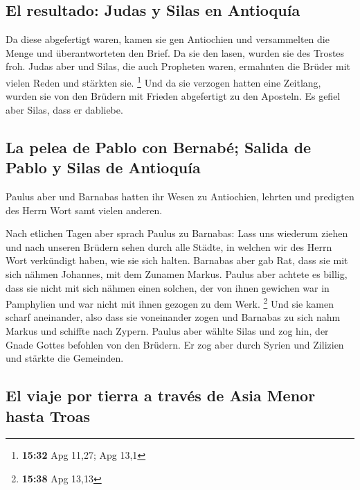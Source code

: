 \hypertarget{el-resultado-judas-y-silas-en-antioquuxeda}{%
\subsection{El resultado: Judas y Silas en
Antioquía}\label{el-resultado-judas-y-silas-en-antioquuxeda}}

 Da diese abgefertigt waren, kamen sie gen Antiochien und
versammelten die Menge und überantworteten den Brief.  Da
sie den lasen, wurden sie des Trostes froh.  Judas aber
und Silas, die auch Propheten waren, ermahnten die Brüder mit vielen
Reden und stärkten sie. \footnote{\textbf{15:32} Apg 11,27; Apg 13,1}
 Und da sie verzogen hatten eine Zeitlang, wurden sie von
den Brüdern mit Frieden abgefertigt zu den Aposteln.  Es
gefiel aber Silas, dass er dabliebe.

\hypertarget{la-pelea-de-pablo-con-bernabuxe9-salida-de-pablo-y-silas-de-antioquuxeda}{%
\subsection{La pelea de Pablo con Bernabé; Salida de Pablo y Silas de
Antioquía}\label{la-pelea-de-pablo-con-bernabuxe9-salida-de-pablo-y-silas-de-antioquuxeda}}

 Paulus aber und Barnabas hatten ihr Wesen zu Antiochien,
lehrten und predigten des Herrn Wort samt vielen anderen.

 Nach etlichen Tagen aber sprach Paulus zu Barnabas: Lass
uns wiederum ziehen und nach unseren Brüdern sehen durch alle Städte, in
welchen wir des Herrn Wort verkündigt haben, wie sie sich halten.
 Barnabas aber gab Rat, dass sie mit sich nähmen
Johannes, mit dem Zunamen Markus.  Paulus aber achtete es
billig, dass sie nicht mit sich nähmen einen solchen, der von ihnen
gewichen war in Pamphylien und war nicht mit ihnen gezogen zu dem Werk.
\footnote{\textbf{15:38} Apg 13,13}  Und sie kamen scharf
aneinander, also dass sie voneinander zogen und Barnabas zu sich nahm
Markus und schiffte nach Zypern.  Paulus aber wählte
Silas und zog hin, der Gnade Gottes befohlen von den Brüdern.
 Er zog aber durch Syrien und Zilizien und stärkte die
Gemeinden.

\hypertarget{el-viaje-por-tierra-a-travuxe9s-de-asia-menor-hasta-troas}{%
\subsection{El viaje por tierra a través de Asia Menor hasta
Troas}\label{el-viaje-por-tierra-a-travuxe9s-de-asia-menor-hasta-troas}}

